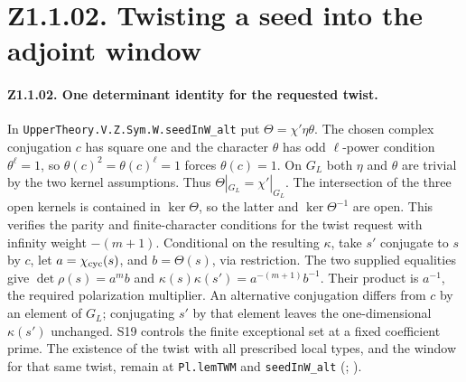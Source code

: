 \section*{Z1.1.02. Twisting a seed into the adjoint window}

\paragraph{Z1.1.02. One determinant identity for the requested twist.}
\label{r8:small:Z1.1.02}
In \nolinkurl{UpperTheory.V.Z.Sym.W.seedInW_alt} put
\(\Theta=\chi'\eta\theta\). The chosen complex conjugation \(c\) has square
one and the character \(\theta\) has odd \(\ell\)-power condition
\(\theta^\ell=1\), so \(\theta(c)^2=\theta(c)^\ell=1\) forces
\(\theta(c)=1\). On \(G_L\) both \(\eta\) and \(\theta\) are trivial by
the two kernel assumptions. Thus \(\Theta|_{G_L}=\chi'|_{G_L}\).
The intersection of the three open kernels is contained in \(\ker\Theta\),
so the latter and \(\ker\Theta^{-1}\) are open. This verifies the parity
and finite-character conditions for the twist request with infinity
weight \(-(m+1)\). Conditional on the resulting \(\kappa\), take \(s'\)
conjugate to \(s\) by \(c\), let \(a=\chi_{\rm cyc}(s)\), and
\(b=\Theta(s)\), via restriction. The two supplied equalities give
\(\det\rho(s)=a^m b\) and \(\kappa(s)\kappa(s')=a^{-(m+1)}b^{-1}\).
Their product is \(a^{-1}\), the required polarization multiplier.
An alternative conjugation differs from \(c\) by an element of \(G_L\);
conjugating \(s'\) by that element leaves the one-dimensional \(\kappa(s')\)
unchanged. S19 controls the finite exceptional set at a fixed coefficient
prime. The existence of the twist with all prescribed local types, and the
window for that same twist, remain at \nolinkurl{Pl.lemTWM} and
\nolinkurl{seedInW_alt} (;
).

